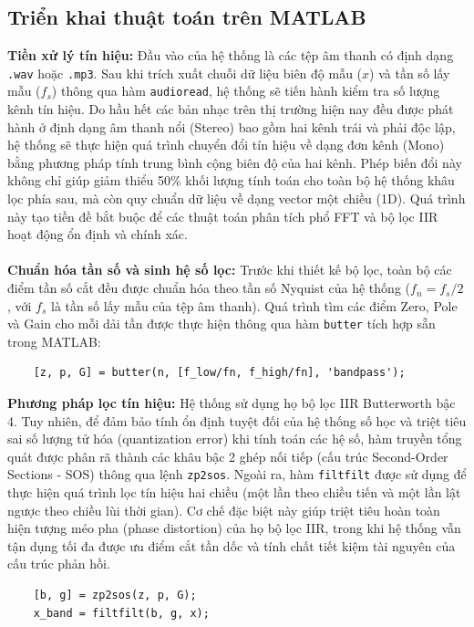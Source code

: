 \documentclass[12pt,a4paper]{article}
\begin{document}
\subsection{Triển khai thuật toán trên MATLAB}
\noindent\textbf{Tiền xử lý tín hiệu:} Đầu vào của hệ thống là các tệp âm thanh có định dạng \texttt{.wav} hoặc \texttt{.mp3}. Sau khi trích xuất chuỗi dữ liệu biên độ mẫu ($x$) và tần số lấy mẫu ($f_s$) thông qua hàm \texttt{audioread}, hệ thống sẽ tiến hành kiểm tra số lượng kênh tín hiệu. Do hầu hết các bản nhạc trên thị trường hiện nay đều được phát hành ở định dạng âm thanh nổi (Stereo) bao gồm hai kênh trái và phải độc lập, hệ thống sẽ thực hiện quá trình chuyển đổi tín hiệu về dạng đơn kênh (Mono) bằng phương pháp tính trung bình cộng biên độ của hai kênh. Phép biến đổi này không chỉ giúp giảm thiểu 50\% khối lượng tính toán cho toàn bộ hệ thống khâu lọc phía sau, mà còn quy chuẩn dữ liệu về dạng vector một chiều (1D). Quá trình này tạo tiền đề bắt buộc để các thuật toán phân tích phổ FFT và bộ lọc IIR hoạt động ổn định và chính xác.\\
\\
\textbf{Chuẩn hóa tần số và sinh hệ số lọc:} 
Trước khi thiết kế bộ lọc, toàn bộ các điểm tần số cắt đều được chuẩn hóa theo tần số Nyquist của hệ thống ($f_n = f_s / 2$, với $f_s$ là tần số lấy mẫu của tệp âm thanh). Quá trình tìm các điểm Zero, Pole và Gain cho mỗi dải tần được thực hiện thông qua hàm \texttt{butter} tích hợp sẵn trong MATLAB:
\begin{verbatim}
    [z, p, G] = butter(n, [f_low/fn, f_high/fn], 'bandpass');
\end{verbatim}

\noindent\textbf{Phương pháp lọc tín hiệu:}
Hệ thống sử dụng họ bộ lọc IIR Butterworth bậc 4. Tuy nhiên, để đảm bảo tính ổn định tuyệt đối của hệ thống số học và triệt tiêu sai số lượng tử hóa (quantization error) khi tính toán các hệ số, hàm truyền tổng quát được phân rã thành các khâu bậc 2 ghép nối tiếp (cấu trúc Second-Order Sections - SOS) thông qua lệnh \texttt{zp2sos}. Ngoài ra, hàm \texttt{filtfilt} được sử dụng để thực hiện quá trình lọc tín hiệu hai chiều (một lần theo chiều tiến và một lần lật ngược theo chiều lùi thời gian). Cơ chế đặc biệt này giúp triệt tiêu hoàn toàn hiện tượng méo pha (phase distortion) của họ bộ lọc IIR, trong khi hệ thống vẫn tận dụng tối đa được ưu điểm cắt tần dốc và tính chất tiết kiệm tài nguyên của cấu trúc phản hồi.

\begin{verbatim}
    [b, g] = zp2sos(z, p, G);
    x_band = filtfilt(b, g, x);
\end{verbatim}
\end{document}
